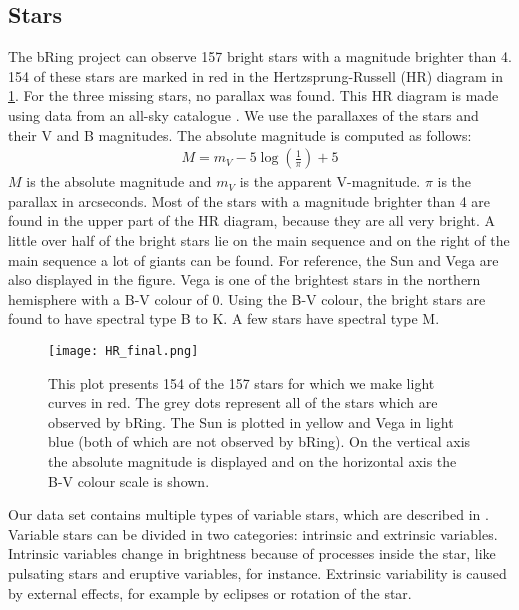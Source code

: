 \documentclass{aa}
\begin{document}
\subsection{Stars}
The bRing project can observe 157 bright stars with a magnitude brighter than 4.
%
154 of these stars are marked in red in the Hertzsprung-Russell (HR) diagram in \ref{HRD}. For the three missing stars, no parallax was found.
%
This HR diagram is made using data from an all-sky catalogue \citep{Kharchenko_2001}.
%
We use the parallaxes of the stars and their V and B magnitudes. The absolute magnitude is computed as follows:
\begin{align}
    M = m_V -5\log\left(\frac{1}{\pi}\right) + 5
\end{align}
$M$ is the absolute magnitude and $m_V$ is the apparent V-magnitude. $\pi$ is the parallax in arcseconds.
%
Most of the stars with a magnitude brighter than 4 are found in the upper part of the HR diagram, because they are all very bright.
%
A little over half of the bright stars lie on the main sequence and on the right of the main sequence a lot of giants can be found.
%
For reference, the Sun and Vega are also displayed in the figure.
%
Vega is one of the brightest stars in the northern hemisphere with a B-V colour of 0.
%
Using the B-V colour, the bright stars are found to have spectral type B to K.
%
A few stars have spectral type M. 
\begin{figure}
    \centering
    \texttt{[image: HR\_final.png]}
    \caption{This plot presents 154 of the 157 stars for which we make light curves in red.
      The grey dots represent all of the stars which are observed by bRing.
      The Sun is plotted in yellow and Vega in light blue (both of which are not observed by bRing).
      On the vertical axis the absolute magnitude is displayed and on the horizontal axis the B-V colour scale is shown.}
    \label{HRD}
  \end{figure}


  

  Our data set contains multiple types of variable stars, which are described in \cite{Samus_2004}.
  Variable stars can be divided in two categories: intrinsic and extrinsic variables.
  Intrinsic variables change in brightness because of processes inside the star, like pulsating stars and eruptive variables, for instance.
  Extrinsic variability is caused by external effects, for example by eclipses or rotation of the star.
\end{document}
